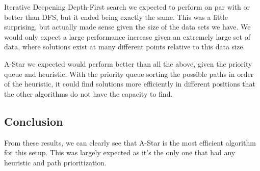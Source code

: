 \documentclass[10pt,letterpaper]{article}
\begin{document}
  Iterative Deepening Depth-First search we expected to perform on par with or
  better than DFS, but it ended being exactly the same. This was a little surprising,
  but actually made sense given the size of the data sets we have. We would only
  expect a large performance increase given an extremely large set of data, where
  solutions exist at many different points relative to this data size.

  A-Star we expected would perform better than all the above, given the priority
  queue and heuristic. With the priority queue sorting the possible paths in order
  of the heuristic, it could find solutions more efficiently in different positions
  that the other algorithms do not have the capacity to find.

  \subsection{Conclusion}
  From these results, we can clearly see that A-Star is the most efficient
  algorithm for this setup. This was largely expected as it's the only one that
  had any heuristic and path prioritization.
\end{document}

